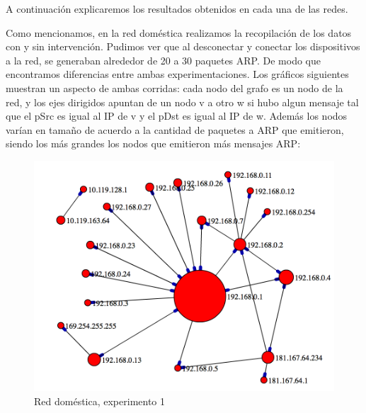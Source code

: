 A continuación explicaremos los resultados obtenidos en cada una de las redes.

Como mencionamos, en la red doméstica realizamos la recopilación de los datos con y sin intervención. Pudimos ver que al desconectar y conectar los dispositivos a la red, se generaban alrededor de 20 a 30 paquetes ARP. De modo que encontramos diferencias entre ambas experimentaciones. Los gráficos siguientes muestran un aspecto de ambas corridas: cada nodo del grafo es un nodo de la red, y los ejes dirigidos apuntan de un nodo v a otro w si hubo algun mensaje tal que el pSrc es igual al IP de v y el pDst es igual al IP de w. Además los nodos varían en tama\~no de acuerdo a la cantidad de paquetes a ARP que emitieron, siendo los más grandes los nodos que emitieron más mensajes ARP:

\begin{figure}[!h]
	\begin{center}
		  \includegraphics[scale=0.4]{Graficos/grafico_1.png}
		  \caption{Red doméstica, experimento 1}
		  \label{fig:contra1}
	\end{center}
\end{figure}

